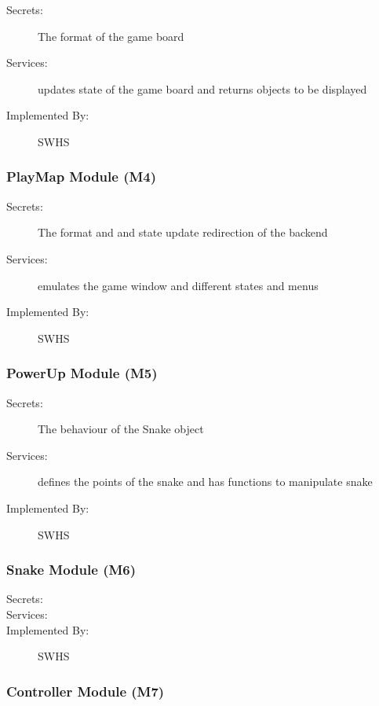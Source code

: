 \documentclass[12pt]{article}
\begin{document}
\begin{description}



\item[Secrets:] The format of the game board
\item[Services:] updates state of the game board and returns objects to be displayed
\item[Implemented By:] SWHS
\end{description} 

\subsubsection{PlayMap Module (M4)}


\begin{description}
\item[Secrets:] The format and and state update redirection of the backend
\item[Services:] emulates the game window and different states and menus
\item[Implemented By:] SWHS
\end{description} 

\subsubsection{PowerUp Module (M5)}


\begin{description}

\item[Secrets:] The behaviour of the Snake object
\item[Services:] defines the points of the snake and has functions to manipulate snake
\item[Implemented By:] SWHS

\end{description} 
 
\subsubsection{Snake Module (M6)}

\begin{description}
\item[Secrets:] 
\item[Services:] 
\item[Implemented By:] SWHS
\end{description}

\subsubsection{Controller Module (M7)}
\end{document}

